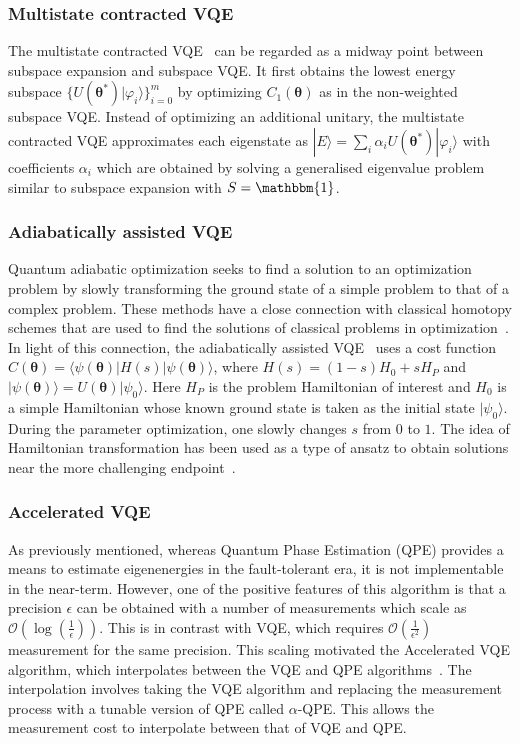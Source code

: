 \documentclass[prx,twocolumn,floatfix,superscriptaddress,longbibliography]{revtex4-1}
\renewcommand{\vec}[1]{\boldsymbol{#1}}  %
\newcommand{\<}{\langle}
\renewcommand{\>}{\rangle}
\newcommand{\ket}[1]{|#1\rangle}               %
\newcommand{\bra}[1]{\langle #1|}              %
\newcommand{\OC}{\mathcal{O}}
\renewcommand{\vec}[1]{\boldsymbol{#1}}  %
\newcommand*{\id}{\mathbbm{1}}
\begin{document}
\subsubsection{ Multistate contracted VQE} The multistate contracted VQE~\cite{parrish2019quantum} can be regarded as a midway point between subspace expansion and subspace VQE. It first obtains the lowest energy subspace $\{ U(\vec{\theta}^*) \ket{\varphi_i}\}_{i=0}^m$ by optimizing  $C_1(\vec{\theta})$ as in the non-weighted subspace VQE. Instead of optimizing an additional unitary, the multistate contracted VQE  approximates each eigenstate as $\ket{E}=\sum_i \alpha_i U(\vec{\theta}^*) \ket{\varphi_i}$ with coefficients $\alpha_i$ which are obtained by solving a generalised eigenvalue problem similar to subspace expansion with $S=\id$. 


\subsubsection{ Adiabatically assisted VQE} Quantum adiabatic optimization seeks to find a solution to an optimization problem by slowly transforming the ground state of a simple problem to that of a complex problem. These methods have a close connection with classical homotopy schemes that are used to find the solutions of classical problems in optimization~\cite{mcclean2020low}.  In light of this connection, the adiabatically assisted VQE~\cite{garcia2018addressing} uses a cost function $C(\vec{\theta})=\bra{\psi(\vec{\theta})}H(s) \ket{\psi(\vec{\theta})}$, where $H(s)=(1-s)H_0+sH_P$ and $\ket{\psi(\vec{\theta})}=U(\vec{\theta})\ket{\psi_0}$.  Here  $H_P$ is the problem Hamiltonian of interest and $H_0$ is a simple Hamiltonian whose known ground state is taken as the initial state $\ket{\psi_0}$. During the parameter optimization, one slowly changes $s$ from $0$ to $1$.  The idea of Hamiltonian transformation has been used as a type of ansatz to obtain solutions near the more challenging endpoint~\cite{cerezo2020variational}.  


\subsubsection{ Accelerated VQE} As previously mentioned, whereas Quantum Phase Estimation (QPE) provides a means to estimate eigenenergies in the fault-tolerant era, it is not implementable in the near-term. However, one of the positive features of this algorithm is that a precision $\epsilon$ can be obtained with a number of measurements which scale as $\OC(\log (\frac{1}{\epsilon}))$. This is in contrast with VQE, which requires $\OC(\frac{1}{\epsilon^2})$ measurement for the same precision.  This scaling motivated the Accelerated VQE algorithm, which interpolates between the VQE and QPE algorithms~\cite{wang2019accelerated,wang2020bayesian,wang2020bayesian2}. The interpolation involves taking the VQE algorithm and replacing the measurement process with a tunable version of QPE called $\alpha$-QPE. This allows the measurement cost to interpolate between that of VQE and QPE. 
\end{document}

